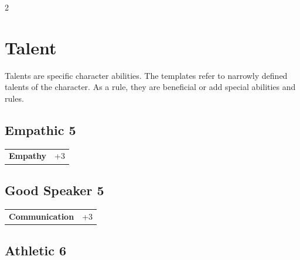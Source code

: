 \begin{multicols}{2}
\section{Talent}

Talents are specific character abilities. The templates refer to narrowly defined talents of the character. As a rule, they are beneficial or add special abilities and rules.

\begin{tcolorbox}
    \subsection*{Empathic \hfill \small{5 }}
    \tcblower




\begin{tabular}{@{}ll@{}}
    \textbf{Empathy} & +3\\
\end{tabular}


\end{tcolorbox}

\begin{tcolorbox}
    \subsection*{Good Speaker \hfill \small{5 }}
    \tcblower




\begin{tabular}{@{}ll@{}}
    \textbf{Communication} & +3\\
\end{tabular}


\end{tcolorbox}

\begin{tcolorbox}
    \subsection*{Athletic \hfill \small{6 }}
    \tcblower





\end{tcolorbox}
\end{multicols}
